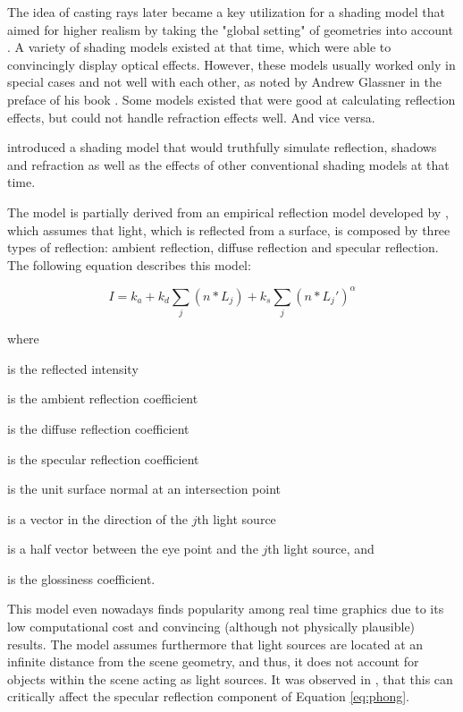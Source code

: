 The idea of casting rays later became a key utilization for a shading model that aimed for higher realism by taking the "global setting" of geometries into account \cite{whitted1979improved}. A variety of shading models existed at that time, which were able to convincingly display optical effects. However, these models usually worked only in special cases and not well with each other, as noted by Andrew Glassner in the preface of his book  \cite{glassner1989introduction}.  Some models existed that were good at calculating reflection effects, but could not handle refraction effects well. And vice versa. 

\cite{whitted1979improved} introduced a shading model that would truthfully simulate reflection, shadows and refraction as well as the effects of other conventional shading models at that time.  

The model is partially derived from an empirical reflection model developed by \cite{phong1975illumination}, which assumes that light, which is reflected from a surface, is composed by three types of reflection: ambient reflection, diffuse reflection and specular reflection. The following equation describes this model:

\begin{equation} \label{eq:phong}
I = k_{a} + k_{d}\sum_{j}(n*L_{j}) + k_{s}\sum_{j}(n*L_{j}\prime)^{\alpha}
\end{equation}

\noindent where
\begin{description}
	\setlength\itemsep{0.05em}
	\item  [$I$] is the reflected intensity
	\item  [$I_{a}$] is the ambient reflection coefficient
	\item  [$k_{d}$] is the diffuse reflection coefficient
	\item  [$k_{s}$] is the specular reflection coefficient
	\item  [$n$] is the unit surface normal at an intersection point
	\item  [$L_{j}$] is a vector in the direction of the $j$th light source
	\item  [$L_{j}\prime$] is a half vector between the eye point and the $j$th light source, and
	\item  [$\alpha$] is the glossiness coefficient.
\end{description}

This model even nowadays finds popularity among real time graphics due to its low computational cost and convincing (although not physically plausible) results. 
The model assumes furthermore that light sources are located at an infinite distance from the scene geometry, and thus, it does not account for objects within the scene acting as light sources. It was observed in \cite{newell1977progression},  that this can critically affect the specular reflection component of Equation \ref{eq:phong}.


